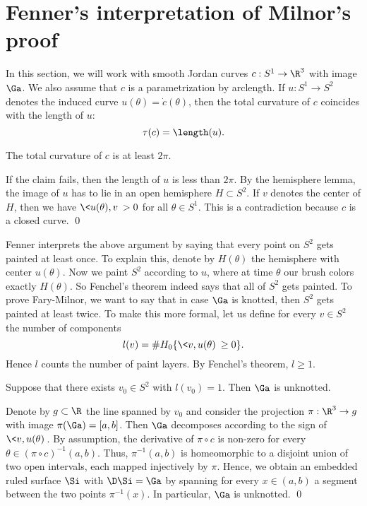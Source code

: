 \section{Fenner's interpretation of Milnor's proof}

In this section, we will work with smooth Jordan curves $c:S^1\to\R^3$ with image $\Ga$. We also assume that $c$
is a parametrization by arclength.
If $u:S^1\to S^2$ denotes the induced curve $u(\theta)=\dot c(\theta)$, then the total curvature of $c$
coincides with the length of $u$:
\[\tau(c)=\length(u).\]


The total curvature of $c$ is at least $2\pi$.
\elem

\proof
If the claim fails, then the length of $u$ is less than $2\pi$.
By the hemisphere lemma, the image of $u$ has to lie in an open hemisphere $H\subset S^2$.
If $v$ denotes the center of $H$, then we have $\<u(\theta),v\> >0$ for all $\theta\in S^1$.
This is a contradiction because $c$ is a closed curve.
\qed
\medskip

Fenner interprets the above argument by saying that every point on $S^2$ gets painted at least once.
To explain this, denote by $H(\theta)$ the hemisphere with center $u(\theta)$.
Now we paint $S^2$ according to $u$, where at time $\theta$ our brush colors exactly $H(\theta)$.
So Fenchel's theorem indeed says that all of $S^2$ gets painted. To prove Fary-Milnor, we want to say that in case $\Ga$
is knotted, then $S^2$ gets painted at least twice.
To make this more formal, let us define for every $v\in S^2$ the number of components
\[l(v)=\# H_0\{\<v,u(\theta)\>\geq 0\}.\]
Hence $l$ counts the number of paint layers. By Fenchel's theorem, $l\geq 1$. 

\blem\label{lem_ruled_unknotted}
Suppose that there exists $v_0\in S^2$ with $l(v_0)=1$. Then $\Ga$ is unknotted.
\elem

\proof
Denote by $g\subset \R$ the line spanned by $v_0$ and consider the projection $\pi:\R^3\to g$
with image $\pi(\Ga)=[a,b]$. Then $\Ga$ decomposes according to the sign of $\<v,u(\theta)\>$.
By assumption, the derivative of $\pi\circ c$ is non-zero for every  $\theta\in(\pi\circ c)^{-1}(a,b)$.
Thus, $\pi^{-1}(a,b)$ is homeomorphic to a disjoint union of two open intervals, each mapped injectively by $\pi$.
Hence, we obtain an embedded ruled surface $\Si$ with $\D\Si=\Ga$ by spanning for every $x\in(a,b)$ a segment between the two points $\pi^{-1}(x)$.
In particular, $\Ga$ is unknotted.  
\qed
\medskip

